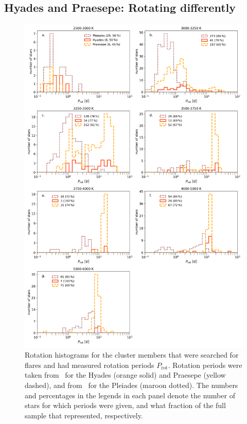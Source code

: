 \documentclass{aa}
\begin{document}
\subsection{Hyades and Praesepe: Rotating differently}
   \begin{figure}
   \centering
            \includegraphics[width=.85\hsize]{pics/rotation/SpT_wise_rotation.png}
         \caption{Rotation histograms for the cluster members that were searched for flares and had measured rotation periods $P_\mathrm{rot}$. Rotation periods were taken from~\citet{douglas2019} for the Hyades (orange solid) and Praesepe (yellow dashed), and from~\citet{rebull_pleiadesrot_2016} for the Pleiades (maroon dotted). The numbers and percentages in the legends in each panel denote the number of stars for which periods were given, and what fraction of the full sample that represented, respectively.}
          \label{fig:rotation_histogram}
   \end{figure}
\end{document}
